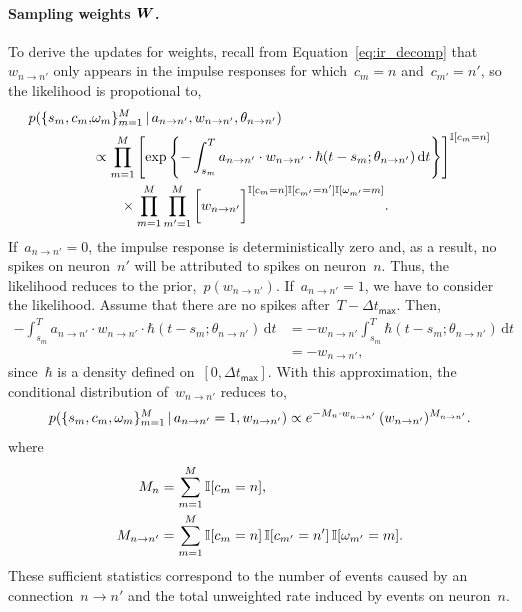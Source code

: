 \paragraph{Sampling weights $\boldsymbol{W}$.} 
To derive the updates for weights, recall from
Equation~\ref{eq:ir_decomp} that~${w_{n \to n'}}$ only
appears in the impulse responses for which~${c_m=n}$
and~${c_{m'}=n'}$, so the likelihood is propotional to,
\begin{align*}
  p(\{s_m,c_m, &\omega_m\}^M_{m=1} \,|\, a_{n \to n'}, w_{n \to n'}, 
  \theta_{n \to n'}) \\
  &\propto \prod_{m=1}^M\left[
    \exp\left\{-\int^T_{s_m} a_{n \to n'} \cdot w_{n \to n'} \cdot \hbar(t - s_m; \theta_{n \to n'}) \, \mathrm{d}t
    \right\} \right]^{\mathbb{I}[c_m=n]} \\
  &\qquad \times \prod_{m=1}^M \prod_{m'=1}^M \bigg[
    w_{n \to n'}\bigg]^{\mathbb{I}[c_{m}=n] \mathbb{I}[c_{m'}=n'] \mathbb{I}[\omega_{m'}=m]}.
\end{align*}
If~${a_{n \to n'}=0}$, the impulse response is deterministically zero
and, as a result, no spikes on neuron~$n'$ will be attributed to spikes
on neuron~$n$. Thus, the likelihood reduces to the prior,~$p(w_{n \to n'})$.
If~${a_{n \to n'}=1}$, we have to consider the likelihood.
Assume that there are no spikes after~${T-\Delta t_{\mathsf{max}}}$. Then,
\begin{align*}
  -\int^T_{s_m} a_{n \to n'} \cdot w_{n \to n'} \cdot
  \hbar(t - s_m; \theta_{n \to n'}) \, \mathrm{d}t
  &= -w_{n \to n'}  \int^T_{s_m} \hbar(t - s_m; \theta_{n \to n'}) \, \mathrm{d}t \\
  &= - w_{n \to n'},
\end{align*}
since~$\hbar$ is a density defined on~$[0,\Delta t_{\mathsf{max}}]$.
With this approximation, the conditional distribution of~$w_{n \to n'}$
reduces to,
\begin{align*}
  p(\{s_m,c_m, \omega_m\}^M_{m=1} \,|\, a_{n \to n'}=1, w_{n \to n'}) 
  \propto 
  e^{-M_n \cdot w_{n \to n'}}  \,
  (w_{n \to n'})^{M_{n \to n'}}.
\end{align*}
where
\begin{align*}
  M_{n} &= \sum_{m=1}^M \mathbb{I}[c_{m}=n], \\
  M_{n \to n'} &= \sum_{m=1}^M \mathbb{I}[c_{m}=n] \, \mathbb{I}[c_{m'}=n'] \, \mathbb{I}[\omega_{m'}=m].
\end{align*}
These sufficient statistics correspond to the number of events caused
by an connection~${n \to n'}$ and the total unweighted rate induced by
events on neuron~$n$.

